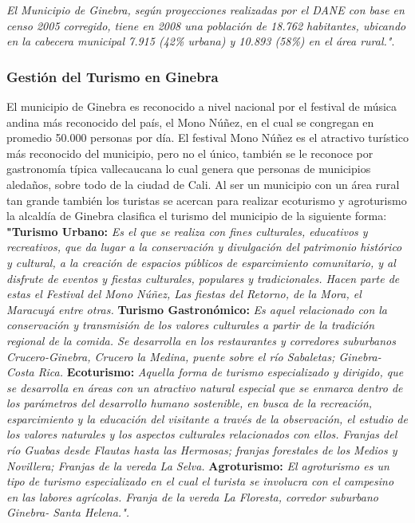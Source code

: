 \documentclass[12pt,letterpaper,openany]{book}
\begin{document}
\textit{El Municipio de Ginebra, según proyecciones realizadas por el DANE con base en censo 2005 corregido, tiene en 2008 una población de 18.762 habitantes, ubicando en la cabecera municipal 7.915 (42\% urbana) y 10.893 (58\%) en el área rural."}\cite{4}.

\subsubsection{Gestión del Turismo en Ginebra}
El municipio de Ginebra es reconocido a nivel nacional por el festival de música andina más reconocido del país, el Mono Núñez, en el cual se congregan en promedio 50.000 personas por día. El festival Mono Núñez es el atractivo turístico más reconocido del municipio, pero no el único, también se le reconoce por gastronomía típica vallecaucana lo cual genera que personas de municipios aledaños, sobre todo de la ciudad de Cali\cite{3}. Al ser un municipio con un área rural tan grande también los turistas se acercan para realizar ecoturismo y agroturismo\cite{3}\cite{18} la alcaldía de Ginebra clasifica el turismo del municipio de la siguiente forma:
\vspace{5mm}\newline
\textbf{"Turismo Urbano:} \textit{Es el que se realiza con fines culturales, educativos y recreativos, que da lugar a la conservación y divulgación del patrimonio histórico y cultural, a la creación de espacios públicos de esparcimiento comunitario, y al disfrute de eventos y fiestas culturales, populares y tradicionales. Hacen parte de estas el Festival del Mono Núñez, Las fiestas del Retorno, de la Mora, el Maracuyá entre otras.}
\vspace{5mm}\newline
\textbf{Turismo Gastronómico:} \textit{Es aquel relacionado con la conservación y transmisión de los valores culturales a partir de la tradición regional de la comida. Se desarrolla en los restaurantes y corredores suburbanos Crucero-Ginebra, Crucero la Medina, puente sobre el río Sabaletas; Ginebra-Costa Rica.}
\vspace{5mm}\newline
\textbf{Ecoturismo:} \textit{Aquella forma de turismo especializado y dirigido, que se desarrolla en áreas con un atractivo natural especial que se enmarca dentro de los parámetros del desarrollo humano sostenible, en busca de la recreación, esparcimiento y la educación del visitante a través de la observación, el estudio de los valores naturales y los aspectos culturales relacionados con ellos. Franjas del río Guabas desde Flautas hasta las Hermosas; franjas forestales de los Medios y Novillera; Franjas de la vereda La Selva.}
\vspace{5mm}\newline
\textbf{Agroturismo:} \textit{El agroturismo es un tipo de turismo especializado en el cual el turista se involucra con el campesino en las labores agrícolas. Franja de la vereda La Floresta, corredor suburbano Ginebra- Santa Helena."\cite{18}.}
\end{document}
